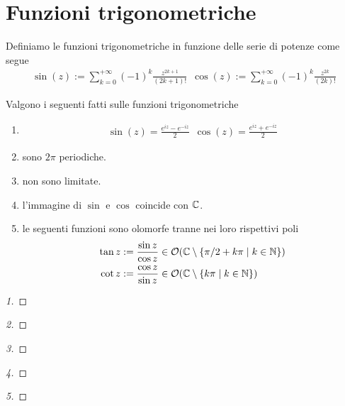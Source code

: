 \section{Funzioni trigonometriche}
	
	\begin{definition}
		\label{defn:sin-cos}
		Definiamo le funzioni trigonometriche in funzione delle serie di potenze come segue
		\begin{equation}
		\begin{aligned}
			\sin(z) := \sum^{+\infty}_{k=0} (-1)^k\frac{z^{2k+1}}{(2k+1)!} \;\ \cos(z) := \sum^{+\infty}_{k=0} (-1)^k\frac{z^{2k}}{(2k)!}
		\end{aligned}
		\end{equation}
	\end{definition}
	
	\begin{theorem}
		Valgono i seguenti fatti sulle funzioni trigonometriche
		\begin{enumerate}
			\item 
			\begin{equation}
			\begin{aligned}
				\sin(z) = \frac{e^{iz} - e^{-iz}}{2} \;\ \cos(z) = \frac{e^{iz} + e^{-iz}}{2}
			\end{aligned}
			\end{equation}
			\item sono $2\pi$ periodiche.
			\item non sono limitate.
			\item l'immagine di $\sin$ e $\cos$ coincide con $\mathbb{C}$.
			\item le seguenti funzioni sono olomorfe tranne nei loro rispettivi poli
			\begin{equation}
			\begin{aligned}
				\tan z & := \frac{\sin z}{\cos z} \in \mathcal{O}(\mathbb{C} \setminus \{ \pi /2 + k\pi \mid k \in \mathbb{N} \}) \\
				\cot z & := \frac{\cos z}{\sin z} \in \mathcal{O}(\mathbb{C} \setminus \{k\pi \mid k \in \mathbb{N} \})
			\end{aligned}
			\end{equation}
		\end{enumerate}
	\end{theorem}
	\begin{proof}[1]
	\end{proof}
	\begin{proof}[2]
	\end{proof}
	\begin{proof}[3]
	\end{proof}
	\begin{proof}[4]
	\end{proof}
	\begin{proof}[5]
	\end{proof}
	
